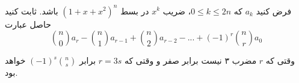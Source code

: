 \p
فرض کنید 
$a_k$
كه
$0 \leq k \leq 2n$،
 ضریب 
 $x^k$ در بسط $(1 + x + x^2)^n$ باشد.
ثابت کنید حاصل عبارت
$${n \choose 0}a_r - {n \choose 1}a_{r - 1} + {n \choose 2}a_{r - 2} - ... + (-1)^r{n \choose r}a_0$$

وقتی که $r$ مضرب ۳ نیست برابر صفر و وقتی که 
$r = 3s$ 
برابر 
$(-1)^s{n \choose s}$ 
خواهد بود.